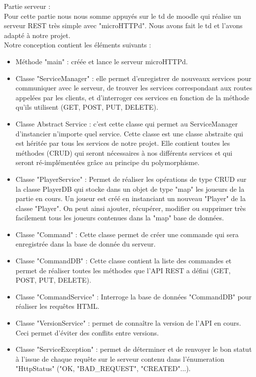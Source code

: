 \documentclass[12pt,a4paper]{article}
\begin{document}
\newpage
Partie serveur : \\
Pour cette partie nous nous somme appuyés sur le td de moodle qui réalise un serveur REST très simple avec "microHTTPd". Nous avons fait le td et l'avons adapté à notre projet. \\Notre conception contient les éléments suivants : 

\begin{itemize}
    \item Méthode "main" : créée et lance le serveur microHTTPd.
    \item Classe "ServiceManager" : elle permet d'enregistrer de nouveaux services pour communiquer avec le serveur, de trouver les services correspondant aux routes appelées par les clients, et d'interroger ces services en fonction de la méthode qu'ils utilisent (GET, POST, PUT, DELETE).
    \item Classe Abstract Service : c'est cette classe qui permet au ServiceManager d'instancier n'importe quel service. Cette classe est une classe abstraite qui est héritée par tous les services de notre projet. Elle contient toutes les méthodes (CRUD) qui seront nécessaires à nos différents services et qui seront ré-implémentées grâce au principe du polymorphisme.  
    \item Classe "PlayerService" : Permet de réaliser les opérations de type CRUD sur la classe PlayerDB qui stocke dans un objet de type "map" les joueurs de la partie en cours. Un joueur est créé en instanciant un nouveau "Player" de la classe "Player". On peut ainsi ajouter, récupérer, modifier ou supprimer très facilement tous les joueurs contenues dans la "map" base de données.
    \item Classe "Command" : Cette classe permet de créer une commande qui sera enregistrée dans la base de donnée du serveur. 
    \item Classe "CommandDB" : Cette classe contient la liste des commandes et permet de réaliser toutes les méthodes que l'API REST a défini (GET, POST, PUT, DELETE).
    \item Classe "CommandService" : Interroge la base de données "CommandDB" pour réaliser les requêtes HTML.
    \item Classe "VersionService" : permet de connaître la version de l'API en cours. Ceci permet d'éviter des conflits entre versions. 
    \item Classe "ServiceException" : permet de déterminer et de renvoyer le bon statut à l'issue de chaque requête sur le serveur contenu dans l'énumeration "HttpStatus" ("OK, "BAD\_REQUEST", "CREATED"...).
\end{itemize}
\end{document}
